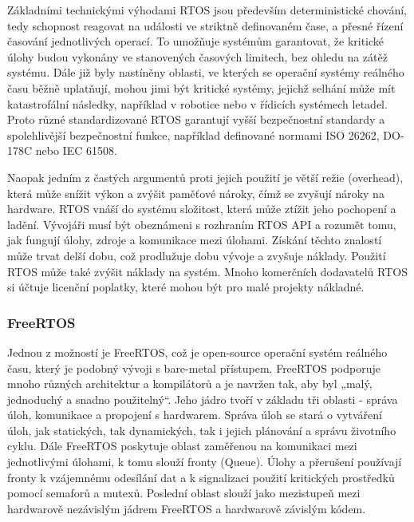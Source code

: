 Základními technickými výhodami RTOS jsou především deterministické chování, tedy schopnost reagovat na události ve striktně definovaném čase, a přesné řízení časování jednotlivých operací. To umožňuje systémům garantovat, že kritické úlohy budou vykonány ve stanovených časových limitech, bez ohledu na zátěž systému. Dále již byly nastíněny oblasti, ve kterých se operační systémy reálného času běžně uplatňují, mohou jimi být kritické systémy, jejichž selhání může mít katastrofální následky, například v robotice nebo v řídicích systémech letadel. Proto různé standardizované RTOS garantují vyšší bezpečnostní standardy a spolehlivější bezpečnostní funkce, například definované normami ISO 26262, DO-178C nebo IEC 61508.

Naopak jedním z častých argumentů proti jejich použití je větší režie (overhead), která může snížit výkon a zvýšit paměťové nároky, čímž se zvyšují nároky na hardware. RTOS vnáší do systému složitost, která může ztížit jeho pochopení a ladění. Vývojáři musí být obeznámeni s rozhraním RTOS API a rozumět tomu, jak fungují úlohy, zdroje a komunikace mezi úlohami. Získání těchto znalostí může trvat delší dobu, což prodlužuje dobu vývoje a zvyšuje náklady. Použití RTOS může také zvýšit náklady na systém. Mnoho komerčních dodavatelů RTOS si účtuje licenční poplatky, které mohou být pro malé projekty nákladné.

\subsubsection{FreeRTOS}
Jednou z možností je FreeRTOS, což je open-source operační systém reálného času, který je podobný vývoji s bare-metal přístupem. FreeRTOS podporuje mnoho různých architektur a kompilátorů a je navržen tak, aby byl „malý, jednoduchý a snadno použitelný“. Jeho jádro tvoří v základu tři oblasti - správa úloh, komunikace a propojení s hardwarem. Správa úloh se stará o vytváření úloh, jak statických, tak dynamických, tak i jejich plánování a správu životního cyklu. Dále FreeRTOS poskytuje oblast zaměřenou na komunikaci mezi jednotlivými úlohami, k tomu slouží fronty (Queue). Úlohy a přerušení používají fronty k vzájemnému odesílání dat a k signalizaci použití kritických prostředků pomocí semaforů a mutexů. Poslední oblast slouží jako mezistupeň mezi hardwarově nezávislým jádrem FreeRTOS a hardwarově závislým kódem. \cite{the_architecture_of_open_source_applications}

